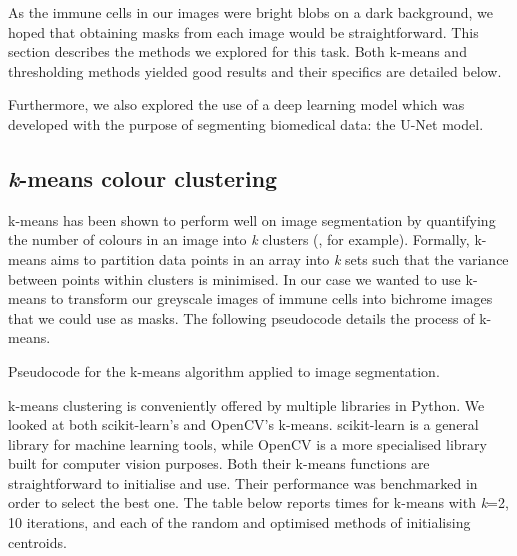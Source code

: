 As the immune cells in our images were bright blobs on a dark background, we hoped that obtaining masks from each image would be straightforward. This section describes the methods we explored for this task. Both k-means and thresholding methods yielded good results and their specifics are detailed below.

Furthermore, we also explored the use of a deep learning model which was developed with the purpose of segmenting biomedical data: the U-Net model. 

\subsection{\textit{k}-means colour clustering}

k-means has been shown to perform well on image segmentation by quantifying the number of colours in an image into \textit{k} clusters (\citealt{ng_kmeans}, for example). Formally, k-means aims to partition data points in an array into \textit{k} sets such that the variance between points within clusters is minimised. In our case we wanted to use k-means to transform our greyscale images of immune cells into bichrome images that we could use as masks. The following pseudocode details the process of k-means.

\begin{algorithm}[h]
    \DontPrintSemicolon
    
\caption{Pseudocode for the k-means algorithm applied to image segmentation.}
\label{alg:kmeans}
\end{algorithm}

k-means clustering is conveniently offered by multiple libraries in Python. We looked at both scikit-learn's and OpenCV's k-means. scikit-learn is a general library  for machine learning tools, while OpenCV is a more specialised library built for computer vision purposes. Both their k-means functions are straightforward to initialise and use. Their performance was benchmarked in order to select the best one. The table below reports times for k-means with \textit{k}=2, 10 iterations, and each of the random and optimised methods of initialising centroids.

